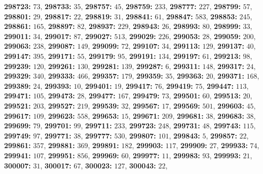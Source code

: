 \textsf{\bfseries 298723:} $73$, \textsf{\bfseries 298733:} $35$, \textsf{\bfseries 298757:} $45$, \textsf{\bfseries 298759:} $233$, \textsf{\bfseries 298777:} $227$, \textsf{\bfseries 298799:} $57$, \textsf{\bfseries 298801:} $29$, \textsf{\bfseries 298817:} $22$, \textsf{\bfseries 298819:} $31$, \textsf{\bfseries 298841:} $61$, \textsf{\bfseries 298847:} $583$, \textsf{\bfseries 298853:} $245$, \textsf{\bfseries 298861:} $165$, \textsf{\bfseries 298897:} $82$, \textsf{\bfseries 298937:} $229$, \textsf{\bfseries 298943:} $26$, \textsf{\bfseries 298993:} $80$, \textsf{\bfseries 298999:} $33$, \textsf{\bfseries 299011:} $34$, \textsf{\bfseries 299017:} $87$, \textsf{\bfseries 299027:} $513$, \textsf{\bfseries 299029:} $226$, \textsf{\bfseries 299053:} $28$, \textsf{\bfseries 299059:} $200$, \textsf{\bfseries 299063:} $238$, \textsf{\bfseries 299087:} $149$, \textsf{\bfseries 299099:} $72$, \textsf{\bfseries 299107:} $34$, \textsf{\bfseries 299113:} $129$, \textsf{\bfseries 299137:} $40$, \textsf{\bfseries 299147:} $395$, \textsf{\bfseries 299171:} $55$, \textsf{\bfseries 299179:} $95$, \textsf{\bfseries 299191:} $134$, \textsf{\bfseries 299197:} $61$, \textsf{\bfseries 299213:} $98$, \textsf{\bfseries 299239:} $120$, \textsf{\bfseries 299261:} $130$, \textsf{\bfseries 299281:} $139$, \textsf{\bfseries 299287:} $6$, \textsf{\bfseries 299311:} $148$, \textsf{\bfseries 299317:} $24$, \textsf{\bfseries 299329:} $340$, \textsf{\bfseries 299333:} $466$, \textsf{\bfseries 299357:} $179$, \textsf{\bfseries 299359:} $35$, \textsf{\bfseries 299363:} $20$, \textsf{\bfseries 299371:} $168$, \textsf{\bfseries 299389:} $24$, \textsf{\bfseries 299393:} $10$, \textsf{\bfseries 299401:} $19$, \textsf{\bfseries 299417:} $76$, \textsf{\bfseries 299419:} $75$, \textsf{\bfseries 299447:} $113$, \textsf{\bfseries 299471:} $105$, \textsf{\bfseries 299473:} $28$, \textsf{\bfseries 299477:} $167$, \textsf{\bfseries 299479:} $73$, \textsf{\bfseries 299501:} $60$, \textsf{\bfseries 299513:} $20$, \textsf{\bfseries 299521:} $203$, \textsf{\bfseries 299527:} $219$, \textsf{\bfseries 299539:} $32$, \textsf{\bfseries 299567:} $17$, \textsf{\bfseries 299569:} $501$, \textsf{\bfseries 299603:} $45$, \textsf{\bfseries 299617:} $109$, \textsf{\bfseries 299623:} $558$, \textsf{\bfseries 299653:} $15$, \textsf{\bfseries 299671:} $209$, \textsf{\bfseries 299681:} $38$, \textsf{\bfseries 299683:} $38$, \textsf{\bfseries 299699:} $79$, \textsf{\bfseries 299701:} $99$, \textsf{\bfseries 299711:} $233$, \textsf{\bfseries 299723:} $248$, \textsf{\bfseries 299731:} $48$, \textsf{\bfseries 299743:} $115$, \textsf{\bfseries 299749:} $97$, \textsf{\bfseries 299771:} $38$, \textsf{\bfseries 299777:} $530$, \textsf{\bfseries 299807:} $101$, \textsf{\bfseries 299843:} $5$, \textsf{\bfseries 299857:} $22$, \textsf{\bfseries 299861:} $357$, \textsf{\bfseries 299881:} $369$, \textsf{\bfseries 299891:} $182$, \textsf{\bfseries 299903:} $117$, \textsf{\bfseries 299909:} $27$, \textsf{\bfseries 299933:} $74$, \textsf{\bfseries 299941:} $107$, \textsf{\bfseries 299951:} $856$, \textsf{\bfseries 299969:} $60$, \textsf{\bfseries 299977:} $11$, \textsf{\bfseries 299983:} $93$, \textsf{\bfseries 299993:} $21$, \textsf{\bfseries 300007:} $31$, \textsf{\bfseries 300017:} $67$, \textsf{\bfseries 300023:} $127$, \textsf{\bfseries 300043:} $22$, 
